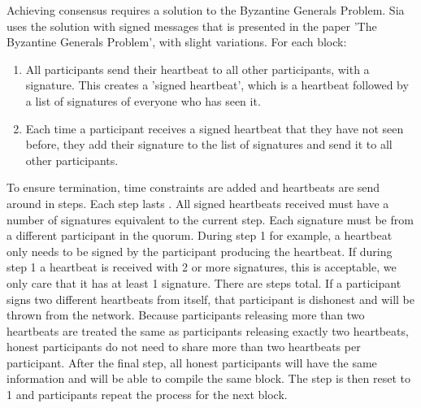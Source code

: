 \documentclass[twocolumn]{article}
\begin{document}
Achieving consensus requires a solution to the Byzantine Generals Problem.
Sia uses the solution with signed messages that is presented in the paper 'The Byzantine Generals Problem', with slight variations.
For each block:
\begin{enumerate}
	\item All participants send their heartbeat to all other participants, with a signature.
	This creates a 'signed heartbeat', which is a heartbeat followed by a list of signatures of everyone who has seen it.
	\item Each time a participant receives a signed heartbeat that they have not seen before, they add their signature to the list of signatures and send it to all other participants.
\end{enumerate}
To ensure termination, time constraints are added and heartbeats are send around in steps.
Each step lasts \stepduration{}.
All signed heartbeats received must have a number of signatures equivalent to the current step.
Each signature must be from a different participant in the quorum.
During step 1 for example, a heartbeat only needs to be signed by the participant producing the heartbeat.
If during step 1 a heartbeat is received with 2 or more signatures, this is acceptable, we only care that it has at least 1 signature.
There are \quorumsize{} steps total.
If a participant signs two different heartbeats from itself, that participant is dishonest and will be thrown from the network.
Because participants releasing more than two heartbeats are treated the same as participants releasing exactly two heartbeats, honest participants do not need to share more than two heartbeats per participant.
After the final step, all honest participants will have the same information and will be able to compile the same block.
The step is then reset to 1 and participants repeat the process for the next block.
\end{document}
